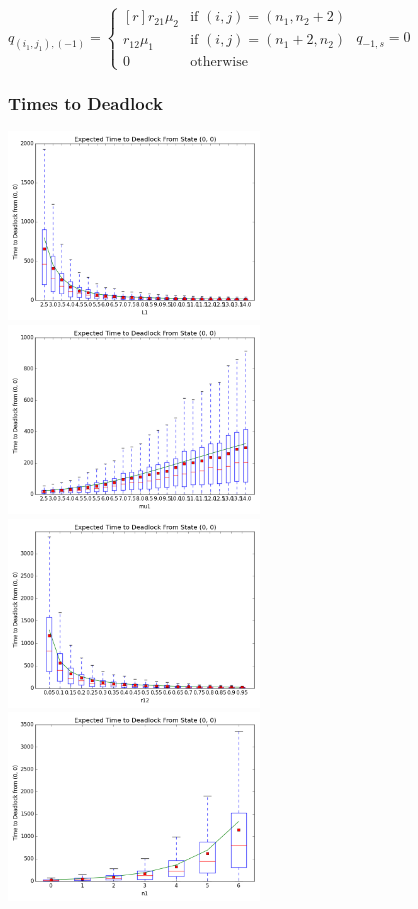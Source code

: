 \documentclass{beamer}
\begin{document}
\begin{frame}
$q_{(i_1, j_1), (-1)} = \left\{
  \begin{matrix*}[ r ]
    r_{21}\mu_2 & \text{if } (i, j) = (n_1, n_2 + 2) \\
    r_{12}\mu_1 & \text{if } (i, j) = (n_1 + 2, n_2) \\
    0 & \text{otherwise}
  \end{matrix*}
  \right.$\newline\newline
$q_{-1, s} = 0$
\end{frame}

\begin{frame}
    \begin{figure}
    
    \end{figure}
\end{frame}

\begin{frame}
    \frametitle{Times to Deadlock}
    \includegraphics[width=0.5\textwidth]{varyL1}
    \includegraphics[width=0.5\textwidth]{varymu1}\newline
    \includegraphics[width=0.5\textwidth]{varyr12}
    \includegraphics[width=0.5\textwidth]{varyn1}
\end{frame}
\end{document}
